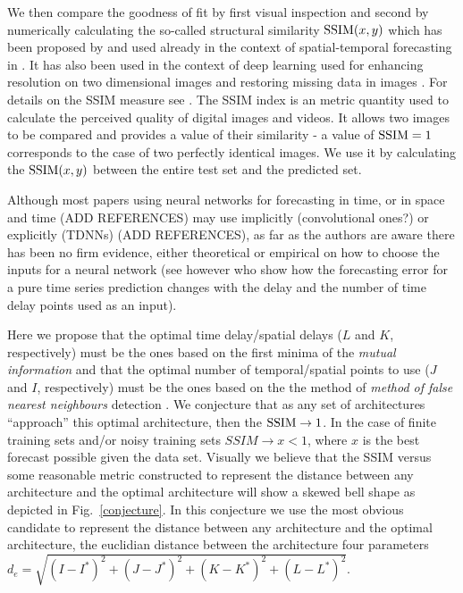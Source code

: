 \documentclass[journal]{IEEEtran}
\begin{document}
We then compare the goodness of fit by first visual inspection and second by numerically calculating the so-called
structural similarity $\textnormal{SSIM}(x,y)$ which has been proposed by \cite{Wang04imagequality} and used already in the context of spatial-temporal forecasting in \cite{covas2016, covaspeixinhojoao}. It has also been used in the context of deep learning used for enhancing
resolution on two dimensional images \cite{2015arXiv150100092D} and restoring missing data in images \cite{2018arXiv180208369Z}. For details on the SSIM measure see \cite{Wang04imagequality,2009ISPM...26...98W, 2012ITIP...21.1488B}.
The SSIM index is an metric quantity used to calculate the perceived quality of digital images and videos.  It
allows two images to be compared and provides a value of their similarity - a value of $\textnormal{SSIM}=1$ corresponds to the case of two
perfectly identical images. We use it by calculating the $\textnormal{SSIM}(x,y)$ between the entire test set and the predicted set.

Although most papers using neural networks for forecasting in time, or in space and time (ADD REFERENCES) may use implicitly
(convolutional ones?) or explicitly (TDNNs) (ADD REFERENCES), as far as the authors are aware there has been no firm evidence,
either theoretical or empirical on how to choose the inputs for a neural network (see however \cite{1555956} who show how
the forecasting error for a pure time series prediction changes with the delay and the number of time delay points used as an input).

Here we propose that the optimal time delay/spatial delays ($L$ and $K$, respectively) must be the ones based on the first minima of the {\em mutual information}
\cite{Fraser86, abarbanel1997analysis, opac-b1092652} and that the optimal number of temporal/spatial points to use
($J$ and $I$, respectively) must be the
ones based on the
 the method of {\em method of false nearest neighbours} detection \cite{1992PhRvA..45.3403K, 1992PhRvA..45.7058M, 1993RvMP...65.1331A, 1996PhT....49k..86A, abarbanel1997analysis}. We conjecture that as any set of architectures ``approach'' this optimal
 architecture, then the $\textnormal{SSIM} \to 1$. In the case of finite training sets and/or noisy training sets $SSIM \to x<1$, where $x$ is the best
 forecast possible given the data set. Visually we believe that the  SSIM versus some reasonable metric constructed to
 represent the distance between any architecture and the optimal
 architecture will show a skewed bell shape as depicted in Fig.\ \ref{conjecture}. In this conjecture we use
 the most obvious candidate to represent the distance between any architecture and the optimal
 architecture, the euclidian distance between the architecture four parameters $d_e=\sqrt{(I-I^*)^2+(J-J^*)^2+(K-K^*)^2+(L-L^*)^2}$.
\end{document}
